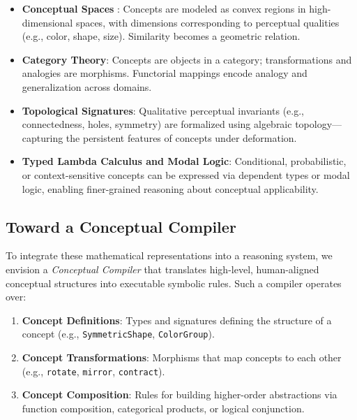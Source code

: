 \documentclass[12pt]{article}
\begin{document}
\begin{itemize}
    \item \textbf{Conceptual Spaces} \cite{gardenfors2000conceptual}: Concepts are modeled as convex regions in high-dimensional spaces, with dimensions corresponding to perceptual qualities (e.g., color, shape, size). Similarity becomes a geometric relation.
    
    \item \textbf{Category Theory}: Concepts are objects in a category; transformations and analogies are morphisms. Functorial mappings encode analogy and generalization across domains.
    
    \item \textbf{Topological Signatures}: Qualitative perceptual invariants (e.g., connectedness, holes, symmetry) are formalized using algebraic topology—capturing the persistent features of concepts under deformation.
    
    \item \textbf{Typed Lambda Calculus and Modal Logic}: Conditional, probabilistic, or context-sensitive concepts can be expressed via dependent types or modal logic, enabling finer-grained reasoning about conceptual applicability.
\end{itemize}

\subsection{Toward a Conceptual Compiler}

To integrate these mathematical representations into a reasoning system, we envision a \textit{Conceptual Compiler} that translates high-level, human-aligned conceptual structures into executable symbolic rules. Such a compiler operates over:

\begin{enumerate}
    \item \textbf{Concept Definitions}: Types and signatures defining the structure of a concept (e.g., \texttt{SymmetricShape}, \texttt{ColorGroup}).
    \item \textbf{Concept Transformations}: Morphisms that map concepts to each other (e.g., \texttt{rotate}, \texttt{mirror}, \texttt{contract}).
    \item \textbf{Concept Composition}: Rules for building higher-order abstractions via function composition, categorical products, or logical conjunction.
\end{enumerate}
\end{document}
